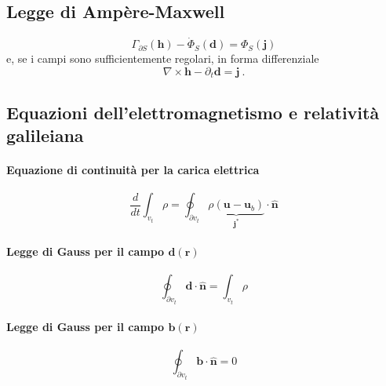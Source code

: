 \subsection{Legge di Ampère-Maxwell}
\begin{equation}
    \Gamma_{\partial S}(\mathbf{h}) - \dot{\Phi}_{S}(\mathbf{d}) = \Phi_{S}(\mathbf{j})
\end{equation}
e, se i campi sono sufficientemente regolari, in forma differenziale
\begin{equation}
    \nabla \times \mathbf{h} - \partial_t \mathbf{d} = \mathbf{j} \ .
\end{equation}



\subsection{Equazioni dell'elettromagnetismo e relatività galileiana}

\paragraph{Equazione di continuità per la carica elettrica}
\begin{equation}
    \dfrac{d}{dt} \int_{v_t}  \rho = \oint_{\partial v_t} \underbrace{\rho (\mathbf{u} - \mathbf{u}_b)}_{\mathbf{j}^*} \cdot \mathbf{\hat{n}}
\end{equation}
\paragraph{Legge di Gauss per il campo $\mathbf{d}(\mathbf{r})$}
\begin{equation}
    \oint_{\partial v_t} \mathbf{d} \cdot \mathbf{\hat{n}} = \int_{v_t} \rho
\end{equation}
\paragraph{Legge di Gauss per il campo $\mathbf{b}(\mathbf{r})$}
\begin{equation}
    \oint_{\partial v_t} \mathbf{b} \cdot \mathbf{\hat{n}} = 0
\end{equation}
